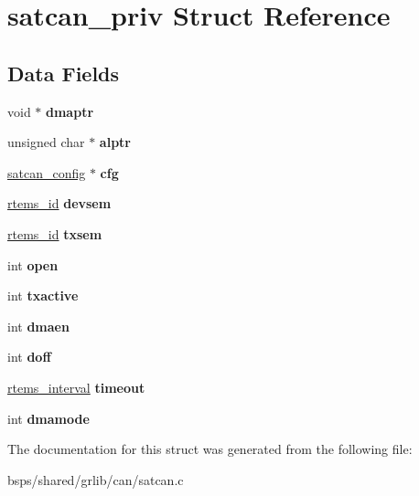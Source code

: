 \hypertarget{structsatcan__priv}{}\section{satcan\+\_\+priv Struct Reference}
\label{structsatcan__priv}
\subsection*{Data Fields}
\begin{DoxyCompactItemize}
\item 
\mbox{\label{structsatcan__priv_ad0facd946fa383fd0e6d63522a1fd67b}} 
void $\ast$ {\bfseries dmaptr}
\item 
\mbox{\label{structsatcan__priv_adf7f6e70c4c58a51f479f9d02f0980d7}} 
unsigned char $\ast$ {\bfseries alptr}
\item 
\mbox{\label{structsatcan__priv_aa0a567394fccea2eb5c483b344f755e3}} 
\mbox{\hyperlink{structsatcan__config}{satcan\+\_\+config}} $\ast$ {\bfseries cfg}
\item 
\mbox{\label{structsatcan__priv_a2bd0f69efcdf3aeaadaed995e2ac5e12}} 
\mbox{\hyperlink{group__ClassicTasks_gab20892b814dced7dd4e5b9bf42becd57}{rtems\+\_\+id}} {\bfseries devsem}
\item 
\mbox{\label{structsatcan__priv_afe401c5b75e8d14c8923daddaa898543}} 
\mbox{\hyperlink{group__ClassicTasks_gab20892b814dced7dd4e5b9bf42becd57}{rtems\+\_\+id}} {\bfseries txsem}
\item 
\mbox{\label{structsatcan__priv_af8494f9545490f7507b047e33b3bd8d4}} 
int {\bfseries open}
\item 
\mbox{\label{structsatcan__priv_a0f748b506a5dcb61225f387b3816f32f}} 
int {\bfseries txactive}
\item 
\mbox{\label{structsatcan__priv_aa8e771039c5f9be78989b4a465d4d1af}} 
int {\bfseries dmaen}
\item 
\mbox{\label{structsatcan__priv_a29c5a3cb8edbb5ba6ec0481d7c7a50be}} 
int {\bfseries doff}
\item 
\mbox{\label{structsatcan__priv_a4f37ca7cc438e7dd9084ca5d7f73a278}} 
\mbox{\hyperlink{group__ClassicTasks_gad39c43f949683d46874e3a5586b93aee}{rtems\+\_\+interval}} {\bfseries timeout}
\item 
\mbox{\label{structsatcan__priv_a3835e868cdd3d661584e2be606639006}} 
int {\bfseries dmamode}
\end{DoxyCompactItemize}


The documentation for this struct was generated from the following file\+:\begin{DoxyCompactItemize}
\item 
bsps/shared/grlib/can/satcan.\+c\end{DoxyCompactItemize}
